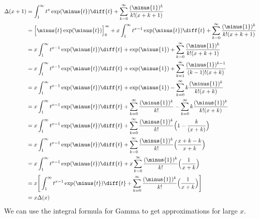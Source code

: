         \begin{subequations}
            \begin{align}
                \Delta(x+1)&=
                \int_{1}^{\infty}t^{x}\exp(\minus{t})\diff{t}+
                \sum_{k=0}^{\infty}\frac{(\minus{1})^{k}}{k!(x+k+1)}\\
                &=\Big[\minus{t}\exp(\minus{t})\Big]_{0}^{\infty}+
                x\int_{1}^{\infty}t^{x-1}\exp(\minus{t})\diff{t}+
                \sum_{k=0}^{\infty}\frac{(\minus{1})^{k}}{k!(x+k+1)}\\
                &=x\int_{1}^{\infty}t^{x-1}\exp(\minus{t})\diff{t}+
                \exp(\minus{1})+\sum_{k=0}^{\infty}
                \frac{(\minus{1})^{k}}{k!(x+k+1)}\\
                &=x\int_{1}^{\infty}t^{x-1}\exp(\minus{t})\diff{t}+
                \exp(\minus{1})+\sum_{k=1}^{\infty}
                \frac{(\minus{1})^{k-1}}{(k-1)!(x+k)}\\
                &=x\int_{1}^{\infty}t^{x-1}\exp(\minus{t})\diff{t}+
                \exp(\minus{1})-\sum_{k=0}^{\infty}
                k\frac{(\minus{1})^{k}}{k!(x+k)}\\
                &=x\int_{1}^{\infty}t^{x-1}\exp(\minus{t})\diff{t}+
                \sum_{k=0}^{\infty}\frac{(\minus{1})^{k}}{k!}-
                \sum_{k=0}^{\infty}k\frac{(\minus{1})^{k}}{k!(x+k)}\\
                &=x\int_{1}^{\infty}t^{x-1}\exp(\minus{t})\diff{t}+
                \sum_{k=0}^{\infty}\frac{(\minus{1})^{k}}{k!}
                \Big(1-\frac{k}{(x+k)}\Big)\\
                &=x\int_{1}^{\infty}t^{x-1}\exp(\minus{t})\diff{t}+
                \sum_{k=0}^{\infty}\frac{(\minus{1})^{k}}{k!}
                \Big(\frac{x+k-k}{x+k}\Big)\\
                &=x\int_{1}^{\infty}t^{x-1}\exp(\minus{t})\diff{t}+
                x\sum_{k=0}^{\infty}\frac{(\minus{1})^{k}}{k!}
                \Big(\frac{1}{x+k}\Big)\\
                &=x\Bigg[\int_{1}^{\infty}t^{x-1}
                \exp(\minus{t})\diff{t}+
                \sum_{k=0}^{\infty}\frac{(\minus{1})^{k}}{k!}
                \Big(\frac{1}{x+k}\Big)\Bigg]\\
                &=x\Delta(x)
            \end{align}
        \end{subequations}
        We can use the integral formula for Gamma to get
        approximations for large $x$.
